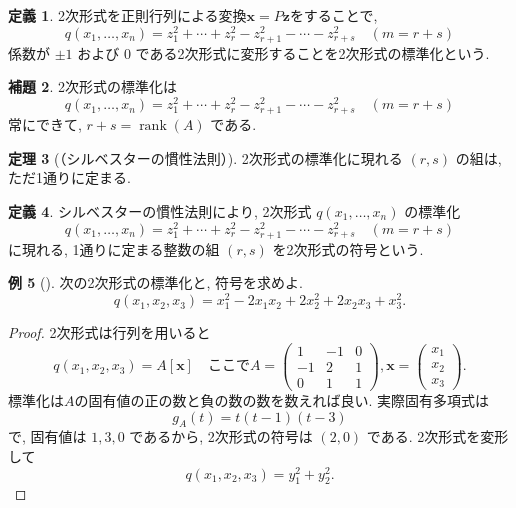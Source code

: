 \documentclass[dvipdfmx,a4paper,11pt]{article} %
\theoremstyle{definition}
\newtheorem{thm}{定理}[section]
\newtheorem{lem}[thm]{補題}
\newtheorem{defn}[thm]{定義}
\newtheorem{eg}[thm]{例}
\begin{document}
\begin{defn}
2次形式を正則行列による変換$\bm{x} =P\bm{z}$をすることで, 
\[
q(x_1,\ldots,x_n)
=
z_1^2+\cdots+z_r^2
-z_{r+1}^2-\cdots-z_{r+s}^2
\quad(m=r+s)
\]
係数が $\pm1$ および $0$ である2次形式に変形することを2次形式の標準化という.
\end{defn}
\begin{lem}
2次形式の標準化は
$$
q(x_1,\ldots,x_n)
=
z_1^2+\cdots+z_r^2
-z_{r+1}^2-\cdots-z_{r+s}^2
\quad(m=r+s)
$$
常にできて, 
$r+s=\operatorname{rank}(A)$ である. 
\end{lem}


\begin{thm}
[（シルベスターの慣性法則）{\cite[定理6.4.2]{M}}]
2次形式の標準化に現れる $(r,s)$ の組は, ただ1通りに定まる.
\end{thm}

\begin{defn}
シルベスターの慣性法則により, 2次形式 $q(x_1,\ldots,x_n)$ の標準化
$$
q(x_1,\ldots,x_n)
=
z_1^2+\cdots+z_r^2
-z_{r+1}^2-\cdots-z_{r+s}^2
\quad(m=r+s)
$$
に現れる, 1通りに定まる整数の組 $(r,s)$ を2次形式の符号という.
\end{defn}

\begin{eg}
[{\cite[例題6.4.2]{M}}]
次の2次形式の標準化と, 符号を求めよ.
\[
q(x_1,x_2,x_3)
=
x_1^2-2x_1x_2+2x_2^2+2x_2x_3+x_3^2.
\]
\end{eg}

\begin{proof}
2次形式は行列を用いると
\[
q(x_1,x_2,x_3)=A[\bm{x}]
\quad
\text{ここで}
A=
\begin{pmatrix}
1&-1&0\\
-1&2&1\\
0&1&1
\end{pmatrix},
\bm{x}=
\begin{pmatrix}
x_1\\
x_2\\
x_3
\end{pmatrix}.
\]
標準化は$A$の固有値の正の数と負の数の数を数えれば良い. 
実際固有多項式は
\[
g_A(t)=t(t-1)(t-3)
\]
で, 固有値は $1,3,0$ であるから, 2次形式の符号は $(2,0)$ である. 2次形式を変形して
\[
q(x_1,x_2,x_3)
=
y_1^2+y_2^2.
\]
\end{proof}
\end{document}
